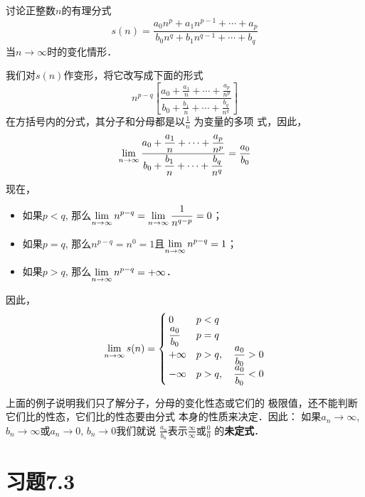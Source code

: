\begin{example}
    讨论正整数$n$的有理分式
\[s(n)=\frac{a_0n^p+a_1n^{p-1}+\cdots+a_p}{b_0n^q+b_1n^{q-1}+\cdots+b_q}\]
当$n\to\infty$时的变化情形．
\end{example}

\begin{solution}
    我们对$s(n)$作变形，将它改写成下面的形式
\[n^{p-q}\left[\frac{a_0+\frac{a_1}{n}+\cdots+\frac{a_p}{n^p}}{b_0+\frac{b_1}{n}+\cdots+\frac{b_q}{n^q}}\right]\]
在方括号内的分式，其分子和分母都是以$\frac{1}{n}$
为变量的多项
式，因此，
\[ \displaystyle\lim_{n\to\infty}\dfrac{a_0+\dfrac{a_1}{n}+\cdots+\dfrac{a_p}{n^p}}{b_0+\dfrac{b_1}{n}+\cdots+\dfrac{b_q}{n^q}}=\dfrac{a_0}{b_0}\]
现在，
\begin{itemize}
    \item 如果$p<q$, 那么$\displaystyle\lim_{n\to\infty}n^{p-q}=\displaystyle\lim_{n\to\infty}\dfrac{1}{n^{q-p}}=0$；
    \item 如果$p=q$, 那么$n^{p-q}=n^0=1$且$\displaystyle\lim_{n\to\infty}n^{p-q}=1$；
    \item 如果$p>q$, 那么$\displaystyle\lim_{n\to\infty}n^{p-q}=+\infty$．
\end{itemize}
因此，
\[ \displaystyle\lim_{n\to\infty} s(n)=\begin{cases}
   0& p<q\\
\dfrac{a_0}{b_0} & p=q\\
+\infty & p>q,\quad \dfrac{a_0}{b_0}>0\\
-\infty & p>q,\quad \dfrac{a_0}{b_0}<0
\end{cases}\]
\end{solution}

上面的例子说明我们只了解分子，分母的变化性态或它们的
极限值，还不能判断它们比的性态，它们比的性态要由分式
本身的性质来决定．因此：
如果$a_n\to\infty$, $b_n\to\infty$或$a_n\to 0$, $b_n\to 0$我们就说
$\frac{a_n}{b_n}$表示$\frac{\infty}{\infty}$或$\frac{0}{0}$
的\textbf{未定式}．

\section*{习题7.3}

